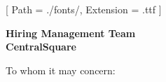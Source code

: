 


\renewcommand{\photo}[2]{}

\geometry{
  left=2cm,
  right=2cm,
  top=2cm,
  bottom=2cm
}



\makecvheader

\setmainfont{NotoSans-Regular}[
  Path = ./fonts/,
  Extension = .ttf
]

\vspace{1cm}
\indent\textbf{Hiring Management Team}\\
\indent\textbf{CentralSquare}

\vspace{0.5cm}

\noindent To whom it may concern:

\vspace{0.5cm}

